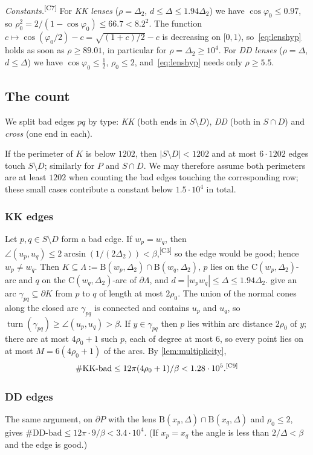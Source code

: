 \documentclass[11pt]{amsart}
\theoremstyle{definition}
\theoremstyle{remark}
\newcommand{\Dt}{\Delta_2}
\newcommand{\turn}{\operatorname{turn}}
\newcommand{\Cc}{\mathrm{C}}      %
\newcommand{\Dd}{\mathrm{B}}      %
\newcommand{\chk}[1]{\textsuperscript{[#1]}}
\begin{document}
\emph{Constants.}\chk{C7} For \emph{KK lenses} ($\rho=\Dt$, $d\le\Delta\le1.94\Dt$) we have $\cos\varphi_0\le 0.97$, so $\rho_0^2=2/(1-\cos\varphi_0)\le 66.7<8.2^2$. The function $c\mapsto\cos(\varphi_0/2)-c=\sqrt{(1+c)/2}-c$ is decreasing on $[0,1)$, so~\eqref{eq:lenshyp} holds as soon as $\rho\ge 89.01$, in particular for $\rho=\Dt\ge10^4$. For \emph{DD lenses} ($\rho=\Delta$, $d\le\Delta$) we have $\cos\varphi_0\le\frac12$, $\rho_0\le 2$, and~\eqref{eq:lenshyp} needs only $\rho\ge 5.5$.

\subsection{The count}
We split bad edges $pq$ by type: \emph{KK} (both ends in $S\setminus D$), \emph{DD} (both in $S\cap D$) and \emph{cross} (one end in each).

If the perimeter of $K$ is below $1202$, then $|S\setminus D|<1202$ and at most $6\cdot1202$ edges touch $S\setminus D$; similarly for $P$ and $S\cap D$. We may therefore assume both perimeters are at least $1202$ when counting the bad edges touching the corresponding row; these small cases contribute a constant below $1.5\cdot10^4$ in total.

\subsubsection*{KK edges}
Let $p,q\in S\setminus D$ form a bad edge. If $w_p=w_q$, then $\angle(u_p,u_q)\le2\arcsin(1/(2\Dt))<\beta$,\chk{C3} so the edge would be good; hence $w_p\neq w_q$. Then $K\subseteq\Lambda:=\Dd(w_p,\Dt)\cap\Dd(w_q,\Dt)$, $p$ lies on the $\Cc(w_p,\Dt)$-arc and $q$ on the $\Cc(w_q,\Dt)$-arc of $\partial\Lambda$, and $d=|w_pw_q|\le\Delta\le1.94\Dt$.  give an arc $\gamma_{pq}\subseteq\partial K$ from $p$ to $q$ of length at most $2\rho_0$. The union of the normal cones along the closed arc $\gamma_{pq}$ is connected and contains $u_p$ and $u_q$, so $\turn(\gamma_{pq})\ge\angle(u_p,u_q)>\beta$. If $y\in\gamma_{pq}$ then $p$ lies within arc distance $2\rho_0$ of $y$; there are at most $4\rho_0+1$ such $p$, each of degree at most $6$, so every point lies on at most $M=6(4\rho_0+1)$ of the arcs. By \cref{lem:multiplicity},
\[
\#\text{KK-bad}\le 12\pi(4\rho_0+1)/\beta<1.28\cdot10^5.\chk{C9}
\]

\subsubsection*{DD edges}
The same argument, on $\partial P$ with the lens $\Dd(x_p,\Delta)\cap\Dd(x_q,\Delta)$ and $\rho_0\le 2$, gives $\#\text{DD-bad}\le 12\pi\cdot 9/\beta<3.4\cdot10^4$. (If $x_p=x_q$ the angle is less than $2/\Delta<\beta$ and the edge is good.)
\end{document}
